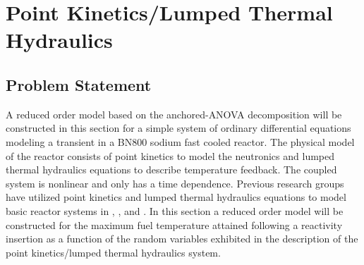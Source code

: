 \section{Point Kinetics/Lumped Thermal Hydraulics}
\label{sec:pointkinetics_th}

\subsection{Problem Statement}
\label{subsec:pointkinetics_th_ps}

A reduced order model based on the anchored-\ac{ANOVA} decomposition will be constructed in this section for a simple system of ordinary differential equations modeling a transient in a BN800 sodium fast cooled reactor. The physical model of the reactor consists of point kinetics to model the neutronics and lumped thermal hydraulics equations to describe temperature feedback. The coupled system is nonlinear and only has a time dependence. Previous research groups have utilized point kinetics and lumped thermal hydraulics equations to model basic reactor systems in \cite{Gilli_annals}, \cite{Gilli_mc2011}, and \cite{Housiadas}. In this section a reduced order model will be constructed for the maximum fuel temperature attained following a reactivity insertion as a function of the random variables exhibited in the description of the point kinetics/lumped thermal hydraulics system.  


